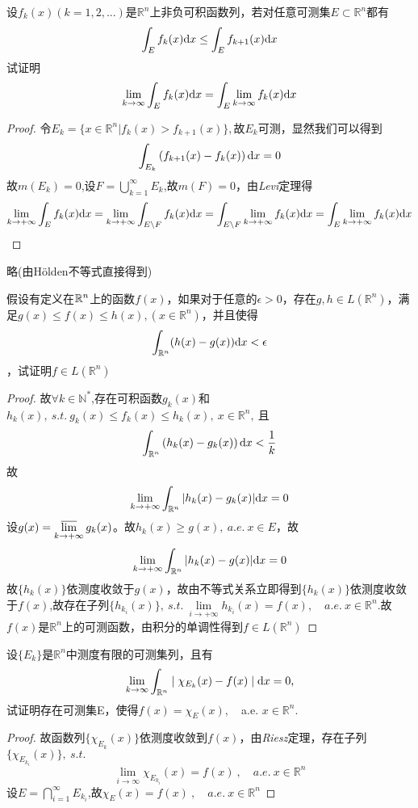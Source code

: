 设$f_k(x)(k=1,2,...)$是$\mathbb{R}^{n}$上非负可积函数列，若对任意可测集$E \subset \mathbb{R}^{n}$都有$$\int_E f_k(x) \mathrm{d}x \leq \int_E f_{k+1}(x) \mathrm{d}x$$试证明$$\lim\limits_{k \to \infty}\int_E f_k(x) \mathrm{d}x = \int_E \lim\limits_{k \to \infty}f_k(x) \mathrm{d}x$$
\begin{proof}
令$E_k=\{x\in \mathbb{R}^n|f_k(x)>f_{k+1}(x)\},$故$E_k$可测，显然我们可以得到$$\int_{E_k}\left(f_{k+1}(x)-f_k(x)\right)\mathrm{d}x=0$$故$m(E_k)=0$,设$F=\bigcup\limits_{k=1}^{\infty}E_k$,故$m(F)=0$，由\emph{Levi}定理得
$$\lim\limits_{k \to +\infty}\int_{E}f_k(x)\mathrm{d}x=\lim\limits_{k \to +\infty}\int_{E\setminus F}f_k(x)\mathrm{d}x=\int_{E\setminus F}\lim\limits_{k \to +\infty}f_k(x)\mathrm{d}x=\int_{E}\lim\limits_{k \to +\infty}f_k(x)\mathrm{d}x$$
\end{proof}


略(由H{\"o}lden不等式直接得到)


假设有定义在$\mathbb{R}^{n}$上的函数$f(x)$，如果对于任意的$\epsilon>0$，存在$g,h\in L(\mathbb{R}^n)$，满足$g(x) \leq f(x) \leq h(x),(x\in \mathbb{R}^n) $，并且使得$$\int_{\mathbb{R}^n}(h(x)-g(x)) \mathrm{d}x<\epsilon$$，试证明$f\in L(\mathbb{R}^n)$
\begin{proof}
故$\forall k\in \mathbb{N}^*$,存在可积函数$g_k(x)$和$h_k(x),\ s.t.\ g_k(x)\leq f_k(x)\leq h_k(x),\ x\in \mathbb{R}^n,\ $且$$\int_{\mathbb{R}^n}\left(h_k(x)-g_k(x)\right)\mathrm{d}x<\frac{1}{k}$$
故$$\lim\limits_{k \to +\infty}\int_{\mathbb{R}^n}|h_k(x)-g_k(x)|\mathrm{d}x=0$$设$g(x)=\varlimsup\limits_{k \to +\infty}g_k(x)$。故$h_k(x)\geq g(x),\ a.e.\ x \in E$，故$$\lim\limits_{k \to +\infty}\int_{\mathbb{R}^n}|h_k(x)-g(x)|\mathrm{d}x=0$$故$\{h_k(x)\}$依测度收敛于$g(x)$，故由不等式关系立即得到$\{h_k(x)\}$依测度收敛于$f(x)$,故存在子列$\{h_{k_i}(x)\},\ s.t.\ \lim\limits_{i \to +\infty}h_{k_i}(x)=f(x),\quad a.e.\  x\in \mathbb{R}^n$.故$f(x)$是$\mathbb{R}^n$上的可测函数，由积分的单调性得到$f\in L(\mathbb{R}^n)$
\end{proof}

设$\{E_k\}$是$\mathbb{R}^n$中测度有限的可测集列，且有$$\lim\limits_{k \to \infty}\int_{\mathbb{R}^n} \mid \chi_{E_k}(x)-f(x) \mid \mathrm{d}x=0,$$试证明存在可测集E，使得$f(x)=\chi_E(x),\quad$a.e. $x \in \mathbb{R}^n$.
\begin{proof}
故函数列$\{\chi_{E_k}(x)\}$依测度收敛到$f(x)$，由\emph{Riesz}定理，存在子列$\{\chi_{E_{k_i}}(x)\},\ s.t.$ $$\lim\limits_{i\to\infty}\chi_{E_{k_i}}(x)=f(x)\ ,\quad a.e.\ x\in\mathbb{R}^n$$设$E=\bigcap\limits_{i=1}^{\infty}E_{k_i}$,故$\chi_{E}(x)=f(x)\ ,\quad a.e. \ x\in \mathbb{R}^n$
\end{proof}




